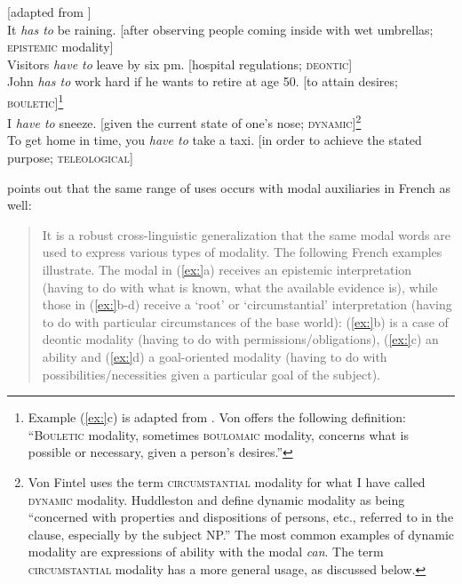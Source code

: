 \ea
{}[adapted from \citealt{vonFintel2006}]\\
\ea It \textit{has to} be raining. [after observing people coming inside with wet umbrellas;\\
  \textsc{epistemic} modality]\\
\ex Visitors \textit{have to} leave by six pm. [hospital regulations; \textsc{deontic}]\\
\ex John \textit{has to} work hard if he wants to retire at age 50. [to attain desires; \textsc{bouletic}]\footnote{Example (\ref{ex:}c) is adapted from \citet{Hacquard2011}. Von \citet{Fintel2006} offers the following definition: “\textsc{Bouletic} modality, sometimes \textsc{boulomaic} modality, concerns what is possible or necessary, given a person’s desires.”}\\
\ex I \textit{have to} sneeze. [given the current state of one’s nose; \textsc{dynamic}]\footnote{Von Fintel uses the term \textsc{circumstantial} modality for what I have called \textsc{dynamic} modality. Huddleston and \citet[178]{Pullum2002} define dynamic modality as being “concerned with properties and dispositions of persons, etc., referred to in the clause, especially by the subject NP.” The most common examples of dynamic modality are expressions of ability with the modal \textit{can}. The term \textsc{circumstantial} modality has a more general usage, as discussed below.}\\
\ex To get home in time, you \textit{have to} take a taxi. [in order to achieve the stated purpose;   \textsc{teleological}]
\z \z


\citet{Hacquard2007} points out that the same range of uses occurs with modal auxiliaries in French as well:


\begin{quote}
It is a robust cross-linguistic generalization that the same modal words are used to express various types of modality. The following French examples illustrate. The modal in (\ref{ex:}a) receives an epistemic interpretation (having to do with what is known, what the available evidence is), while those in (\ref{ex:}b-d) receive a ‘root’ or ‘circumstantial’ interpretation (having to do with particular circumstances of the base world): (\ref{ex:}b) is a case of deontic modality (having to do with permissions/obligations), (\ref{ex:}c) an ability and (\ref{ex:}d) a goal-oriented modality (having to do with possibilities/necessities given a particular goal of the subject).
\end{quote}

